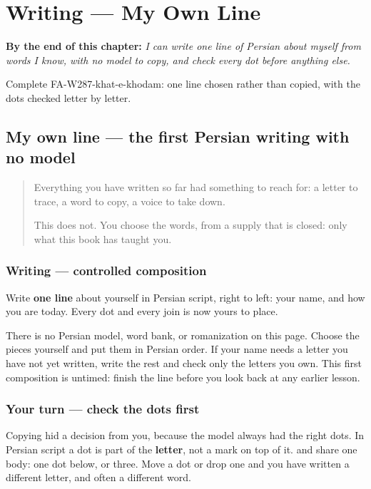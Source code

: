 
\chapter{Writing --- My Own Line}
\label{ch:fa-my-own-line}

\begin{chapteropening}
\textbf{By the end of this chapter:} \emph{I can write one line of Persian about myself from words I know, with no model to copy, and check every dot before anything else.}

Complete FA-W287-khat-e-khodam: one line chosen rather than copied, with the dots checked letter by letter.
\end{chapteropening}

\section[(my own line)]{My own line — the first Persian writing with no model}

\label{lesson:FA-W287-khat-e-khodam}



\begin{quote}
Everything you have written so far had something to reach for: a letter to trace, a word to copy, a voice to take down.

This does not. You choose the words, from a supply that is closed: only what this book has taught you.
\end{quote}

\subsection*{Writing — controlled composition}
Write \textbf{one line} about yourself in Persian script, right to left: your name, and how you are today. Every dot and every join is now yours to place.

There is no Persian model, word bank, or romanization on this page. Choose the pieces yourself and put them in Persian order. If your name needs a letter you have not yet written, write the rest and check only the letters you own. This first composition is untimed: finish the line before you look back at any earlier lesson.

\subsection*{Your turn — check the dots first}
Copying hid a decision from you, because the model always had the right dots. In Persian script a dot is part of the \textbf{letter}, not a mark on top of it. \textbf{} and \textbf{} share one body: one dot below, or three. Move a dot or drop one and you have written a different letter, and often a different word.

